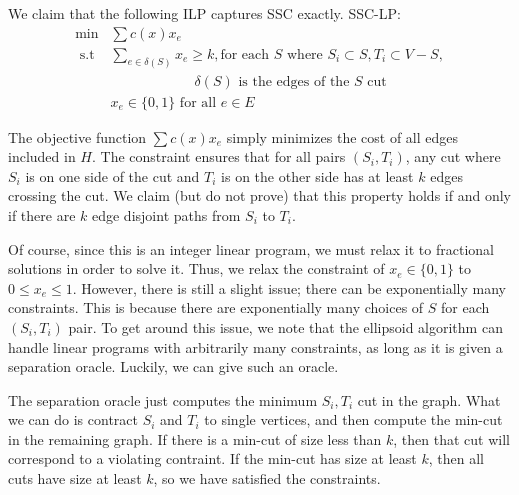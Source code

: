\documentclass[12pt]{article}
\begin{document}
We claim that the following ILP captures SSC exactly. 
SSC-LP:
\begin{align}
\min & \sum c(x) x_e  \\
\text{ s.t } & \sum_{e \in \delta(S)} x_e \geq k, \text{for each }S\text{ where } S_i \subset S,T_i \subset V - S, \\ & \hspace{1in}\delta(S) \text{ is the edges of the $S$ cut } \\
& x_e \in \{0,1\} \text{ for all }e \in E
\end{align}

The objective function $\sum c(x) x_e$ simply minimizes the cost of all edges included in $H$. The constraint ensures that for all pairs $(S_i,T_i)$, any cut where $S_i$ is on one side of the cut and $T_i$ is on the other side has at least $k$ edges crossing the cut. We claim (but do not prove) that this property holds if and only if there are $k$ edge disjoint paths from $S_i$ to $T_i$. 
%
%
% 

Of course, since this is an integer linear program, we must relax it to fractional solutions in order to solve it. Thus, we relax the constraint of $x_e \in \{0,1\}$ to $0 \leq x_e \leq 1$. However, there is still a slight issue; there can be exponentially many constraints. This is because there are exponentially many choices of $S$ for each $(S_i,T_i)$ pair. To get around this issue, we note that the ellipsoid algorithm can handle linear programs with arbitrarily many constraints, as long as it is given a separation oracle. Luckily, we can give such an oracle. 

The separation oracle just computes the minimum $S_i, T_i$ cut in the graph. What we can do is contract $S_i$ and $T_i$ to single vertices, and then compute the min-cut in the remaining graph. If there is a min-cut of size less than $k$, then that cut will correspond to a violating contraint. If the min-cut has size at least $k$, then all cuts have size at least $k$, so we have satisfied the constraints.
\end{document}
